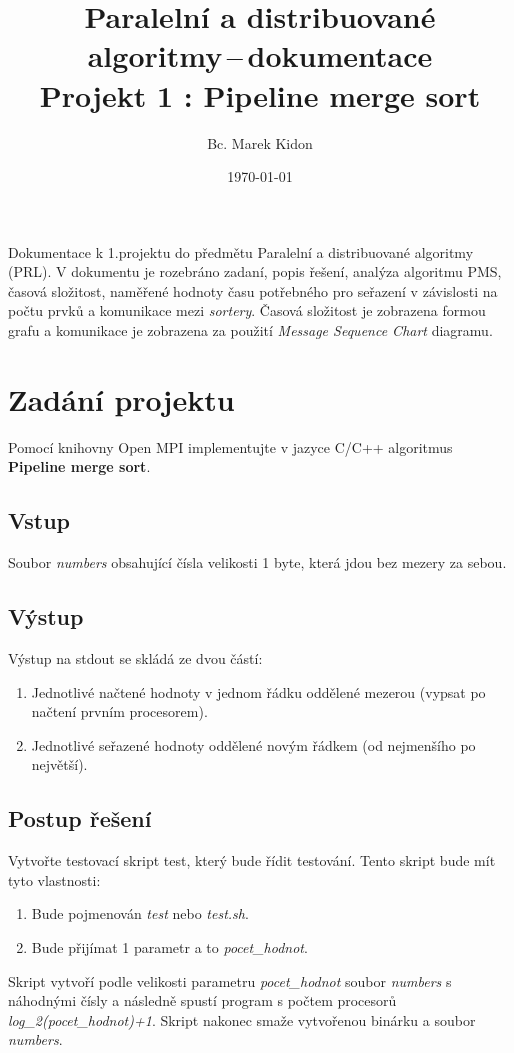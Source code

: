 \documentclass[a4paper, 10pt]{article}[5.10.2011]
\title{Paralelní a distribuované algoritmy\,--\,dokumentace\\ Projekt 1 : Pipeline merge sort}
\author{Bc. Marek Kidon}
\date{\today}
\begin{document}
\maketitle
\noindent Dokumentace k 1.projektu do předmětu Paralelní a distribuované algoritmy (PRL). V dokumentu je rozebráno zadaní, popis řešení, analýza algoritmu PMS, časová složitost, naměřené hodnoty času potřebného pro seřazení v závislosti na počtu prvků a komunikace mezi \textit{sortery}. Časová složitost je zobrazena formou grafu a komunikace je zobrazena za použití \textit{Message Sequence Chart} diagramu.
\section{Zadání projektu}
Pomocí knihovny Open MPI implementujte v jazyce C/C++ algoritmus \textbf{Pipeline merge sort}.
\subsection*{Vstup}
Soubor \textit{numbers} obsahující čísla velikosti 1 byte, která jdou bez mezery za sebou.
\subsection*{Výstup}
Výstup na stdout se skládá ze dvou částí: 
\begin{enumerate}
\item Jednotlivé načtené hodnoty v jednom řádku oddělené mezerou (vypsat po načtení prvním procesorem).
\item Jednotlivé seřazené hodnoty oddělené novým řádkem (od nejmenšího po největší).
\end{enumerate}
\subsection*{Postup řešení}
Vytvořte testovací skript test, který bude řídit testování. Tento skript bude mít tyto vlastnosti:
\begin{enumerate}
	\item Bude pojmenován \textit{test} nebo \textit{test.sh}.
	\item Bude přijímat 1 parametr a to \textit{pocet\_hodnot}.
\end{enumerate}

Skript vytvoří podle velikosti parametru \textit{pocet\_hodnot} soubor \textit{numbers} s náhodnými čísly a následně spustí program s počtem procesorů \textit{log\_2(pocet\_hodnot)+1}. Skript nakonec smaže vytvořenou binárku a soubor \textit{numbers}. 
\end{document}
